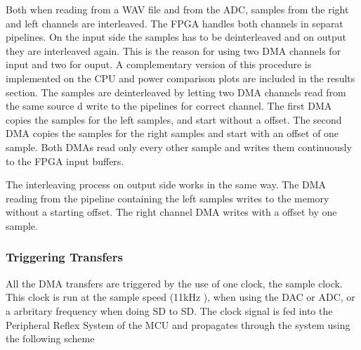 Both when reading from a WAV file and from the ADC, samples from the
right and left channels are interleaved. The FPGA handles both channels in separat
pipelines. On the input side the samples has to be deinterleaved and on output they
are interleaved again. This is the reason for using two DMA channels for input and 
two for ouput. A complementary version of this procedure is implemented on the CPU 
and power comparison plots are included in the results section.  
The samples are deinterleaved by letting two DMA channels read from the same source d write to 
the pipelines for correct channel. The first DMA copies the samples for the left samples,
and start without a offset. The second DMA copies the samples for the right samples and 
start with an offset of one sample. Both DMAs read only every other sample and writes them
continuously to the FPGA input buffers. 

The interleaving process on output side works in the same way. The DMA reading from the
pipeline containing the left samples writes to the memory without a starting offset.
The right channel DMA writes with a offset by one sample. 

\subsubsection{Triggering Transfers}

All the DMA transfers are triggered by the use of one clock, the sample clock. This
clock is run at the sample speed (11kHz ), 
when using the DAC or ADC, or a arbritary frequency when doing SD to SD. The clock 
signal is fed into the Peripheral Reflex System of the MCU and propagates through the 
system using the following scheme 

